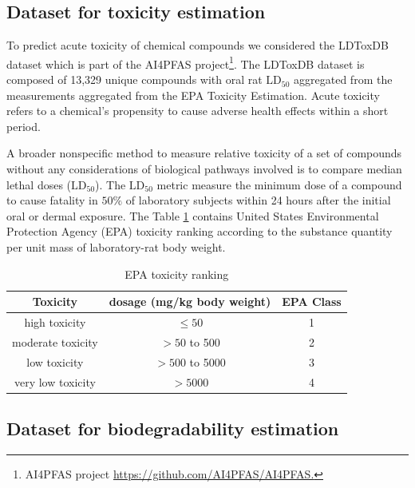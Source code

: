 \documentclass{article}
\begin{document}
\subsection{Dataset for toxicity estimation}

To predict acute toxicity of chemical compounds we considered the LDToxDB dataset \cite{feinstein2021uncertainty} which is part of the AI4PFAS project\footnote{AI4PFAS project \url{ https://github.com/AI4PFAS/AI4PFAS.}}. 
The LDToxDB dataset is composed of 13,329 unique compounds with oral rat $\text{LD}_{50}$ aggregated from the measurements aggregated from the EPA Toxicity Estimation. Acute toxicity refers to a chemical’s propensity to cause adverse health effects within a short period.

A broader nonspecific method to measure relative toxicity of a set of compounds without any considerations of biological pathways involved is to compare median lethal doses ($\text{LD}_{50}$). 
The $\text{LD}_{50}$ metric measure the minimum dose of a compound to cause fatality in $50\%$ of laboratory subjects within 24 hours after the initial oral or dermal exposure. The Table \ref{TableRanking} contains United States Environmental Protection Agency (EPA) toxicity ranking according to the substance quantity per unit mass of laboratory-rat body weight.

\begin{table}[htbp]
\scriptsize
	\begin{center}
		\caption{EPA toxicity ranking}\label{TableRanking}
		\begin{tabular}{c|cc}
        
			\hline
            Toxicity & dosage (mg/kg body weight)& EPA Class \\
			\hline
		
			high toxicity  & $\leq 50$ &  1  \\
			
			moderate toxicity & $>50$ to 500 & 2 \\
			
			low toxicity & $>500$ to 5000 & 3 \\
			
			very low toxicity & $>5000$ & 4 \\
			
			\hline
		\end{tabular}
	\end{center}
\end{table}


\subsection{Dataset for biodegradability estimation}
\end{document}
